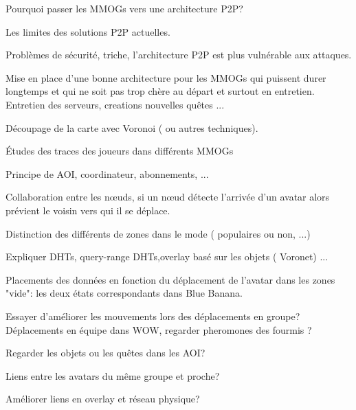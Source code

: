 Pourquoi passer les MMOGs vers une architecture P2P?
	
Les limites des solutions P2P actuelles.

Problèmes de sécurité, triche, l'architecture P2P est plus vulnérable aux attaques.

Mise en place d'une bonne architecture pour les MMOGs qui puissent durer longtemps et qui ne soit pas trop chère au départ et surtout en entretien. Entretien des serveurs, creations nouvelles quêtes ...

Découpage de la carte avec Voronoi ( ou autres techniques).

Études des traces des joueurs dans différents MMOGs

Principe de AOI, coordinateur, abonnements, ...

Collaboration entre les nœuds, si un nœud détecte l'arrivée d'un avatar alors prévient le voisin vers qui il se déplace. 

Distinction des différents de zones dans le mode ( populaires ou non, ...)

Expliquer DHTs, query-range DHTs,overlay basé sur les objets ( Voronet)  ...

Placements des données en fonction du déplacement de l'avatar dans les zones "vide": les deux états correspondants dans Blue Banana.

Essayer d'améliorer les mouvements lors des déplacements en groupe? Déplacements en équipe dans WOW, regarder pheromones des fourmis ? 

Regarder les objets ou les quêtes dans les AOI?

Liens entre les avatars du même groupe et proche?  

Améliorer liens en overlay et réseau physique? 
